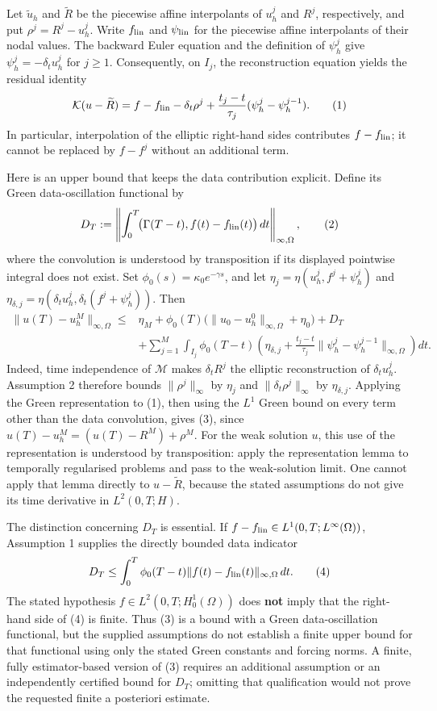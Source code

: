 \documentclass[11pt]{article}
\begin{document}
Let \(\widetilde u_h\) and \(\widetilde R\) be the piecewise affine interpolants of \(u_h^j\) and \(R^j\), respectively, and put \(\rho^j=R^j-u_h^j\). Write \(f_{\rm lin}\) and \(\psi_{\rm lin}\) for the piecewise affine interpolants of their nodal values. The backward Euler equation and the definition of \(\psi_h^j\) give \(\psi_h^j=-\delta_tu_h^j\) for \(j\geq1\). Consequently, on \(I_j\), the reconstruction equation yields the residual identity
\[
 \mathcal K(u-\widetilde R)
 =f-f_{\rm lin}-\delta_t\rho^j
   +\frac{t_j-t}{\tau_j}(\psi_h^j-\psi_h^{j-1}).                 \tag{1}
\]
In particular, interpolation of the elliptic right-hand sides contributes \(f-f_{\rm lin}\); it cannot be replaced by \(f-f^j\) without an additional term.

Here is an upper bound that keeps the data contribution explicit. Define its Green data-oscillation functional by
\[
 D_T:=\left\|\int_0^T\!\bigl(\Gamma(T-t),f(t)-f_{\rm lin}(t)\bigr)\,dt\right\|_{\infty,\Omega},          \tag{2}
\]
where the convolution is understood by transposition if its displayed pointwise integral does not exist. Set \(\phi_0(s)=\kappa _0e^{-\gamma s}\), and let \(\eta_j=\eta(u_h^j,f^j+\psi_h^j)\) and \(\eta_{\delta,j}=\eta(\delta_tu_h^j,\delta_t(f^j+\psi_h^j))\). Then
\[
\begin{split}
 \|u(T)-u_h^M\|_{\infty,\Omega}\leq{}&
 \eta_M+\phi_0(T)\bigl(\|u_0-u_h^0\|_{\infty,\Omega}+\eta_0\bigr)+D_T\\
 &+\sum_{j=1}^M\int_{I_j}\phi_0(T-t)
 \left(\eta_{\delta,j}+\frac{t_j-t}{\tau_j}
       \|\psi_h^j-\psi_h^{j-1}\|_{\infty,\Omega}\right)dt.     
\end{split}
\]
Indeed, time independence of \(\mathcal M\) makes \(\delta_tR^j\) the elliptic reconstruction of \(\delta_tu_h^j\). Assumption 2 therefore bounds \(\|\rho^j\|_\infty\) by \(\eta_j\) and \(\|\delta_t\rho^j\|_\infty\) by \(\eta_{\delta,j}\). Applying the Green representation to (1), then using the \(L^1\) Green bound on every term other than the data convolution, gives (3), since \(u(T)-u_h^M=(u(T)-R^M)+\rho^M\). For the weak solution \(u\), this use of the representation is understood by transposition: apply the representation lemma to temporally regularised problems and pass to the weak-solution limit. One cannot apply that lemma directly to \(u-\widetilde R\), because the stated assumptions do not give its time derivative in \(L^2(0,T;H)\).

The distinction concerning \(D_T\) is essential. If \(f-f_{\rm lin}\in L^1(0,T;L^\infty(\Omega))\), Assumption 1 supplies the directly bounded data indicator
\[
 D_T\leq\int_0^T\phi_0(T-t)\|f(t)-f_{\rm lin}(t)\|_{\infty,\Omega}\,dt. \tag{4}
\]
The stated hypothesis \(f\in L^2(0,T;H_0^1(\Omega))\) does \textbf{not} imply that the right-hand side of (4) is finite. Thus (3) is a bound with a Green data-oscillation functional, but the supplied assumptions do not establish a finite upper bound for that functional using only the stated Green constants and forcing norms. A finite, fully estimator-based version of (3) requires an additional assumption or an independently certified bound for \(D_T\); omitting that qualification would not prove the requested finite a posteriori estimate.
\end{document}
